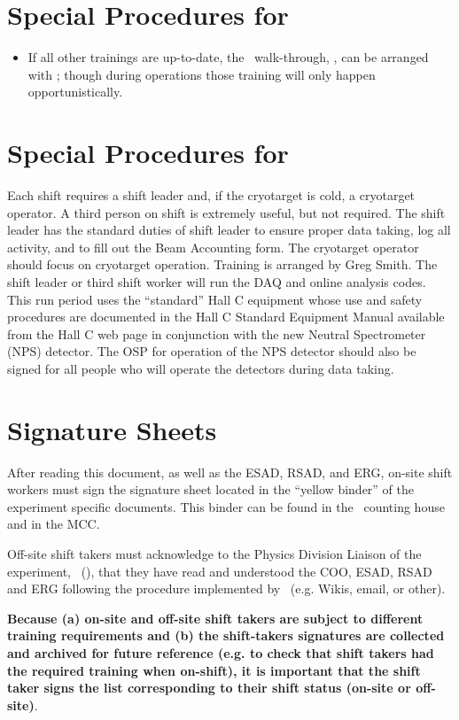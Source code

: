 %
\newpage
\section{Special Procedures for \HALL}

\begin{itemize}

\item{
If all other trainings are up-to-date, the \HALL\ walk-through, \AWARENESS, can be arranged 
with {\WALKTHROUGHTRAINER}; 
though during operations those training will only 
happen opportunistically.   
}
\end{itemize}

%
\newpage
\section{Special Procedures for \EXPTS}

Each shift requires a shift leader and, if the cryotarget is cold, a cryotarget 
operator.  A third person on shift is extremely useful, but not required. The shift leader 
has the standard
duties of shift leader to ensure proper data taking, log all activity, and to fill out
the Beam Accounting form. The cryotarget operator should focus on cryotarget
operation. Training is arranged by Greg Smith. The shift leader or third
shift worker will run the DAQ and online analysis codes.
This run period uses the ``standard'' Hall C equipment whose
use and safety procedures are documented in the Hall C Standard Equipment
Manual available from the Hall C web page in conjunction with the new Neutral Spectrometer (NPS) detector. The OSP for operation of the NPS detector should also be signed for all people who will operate the detectors during data taking.


\newpage
\section{Signature Sheets}

After reading this document, as well as the ESAD, RSAD, and ERG, on-site shift workers must sign
the signature sheet located in the ``yellow binder'' of the experiment specific documents.
This binder can be found in the \HALL\ counting house and in the MCC.

Off-site shift takers must acknowledge to the Physics Division Liaison of the experiment, \PHYSDIVLIAISON\ (\PHYSDIVLIAISONEMAIL),
that they have read and understood the COO, ESAD, RSAD and ERG following the procedure implemented by \HALL\ (e.g. Wikis, email, or other).

{\bf Because (a) on-site and off-site shift takers are subject to different training requirements and (b) the shift-takers signatures are collected and archived for future reference (e.g. to check that shift takers had the required training when on-shift), it is important that the shift taker signs the list corresponding to their shift status (on-site or off-site)}.
